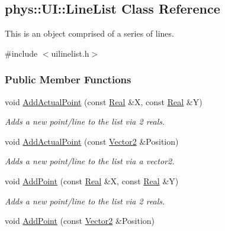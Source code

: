 \hypertarget{classphys_1_1UI_1_1LineList}{
\subsection{phys::UI::LineList Class Reference}
\label{classphys_1_1UI_1_1LineList}
}


This is an object comprised of a series of lines.  




{\ttfamily \#include $<$uilinelist.h$>$}

\subsubsection*{Public Member Functions}
\begin{DoxyCompactItemize}
\item 
void \hyperlink{classphys_1_1UI_1_1LineList_a2bb72fa96c9ed9ea64c78eb8286fd713}{AddActualPoint} (const \hyperlink{namespacephys_af7eb897198d265b8e868f45240230d5f}{Real} \&X, const \hyperlink{namespacephys_af7eb897198d265b8e868f45240230d5f}{Real} \&Y)
\begin{DoxyCompactList}\small\item\em Adds a new point/line to the list via 2 reals. \item\end{DoxyCompactList}\item 
void \hyperlink{classphys_1_1UI_1_1LineList_a298919a32f4b41ce9414c47f26122778}{AddActualPoint} (const \hyperlink{classphys_1_1Vector2}{Vector2} \&Position)
\begin{DoxyCompactList}\small\item\em Adds a new point/line to the list via a vector2. \item\end{DoxyCompactList}\item 
void \hyperlink{classphys_1_1UI_1_1LineList_a9e706df0f3c6419b64cf136b688fe5aa}{AddPoint} (const \hyperlink{namespacephys_af7eb897198d265b8e868f45240230d5f}{Real} \&X, const \hyperlink{namespacephys_af7eb897198d265b8e868f45240230d5f}{Real} \&Y)
\begin{DoxyCompactList}\small\item\em Adds a new point/line to the list via 2 reals. \item\end{DoxyCompactList}\item 
void \hyperlink{classphys_1_1UI_1_1LineList_a586b848c2eeebeead80d3f5f3fd05ad5}{AddPoint} (const \hyperlink{classphys_1_1Vector2}{Vector2} \&Position)

\end{DoxyCompactItemize}
